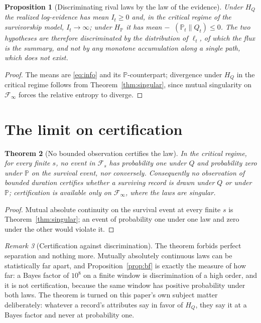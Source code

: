 \documentclass[11pt]{article}
\newcommand{\PP}{\mathbb{P}}
\newcommand{\Fc}{\mathcal{F}}
\DeclareMathOperator{\KL}{D_{\mathrm{KL}}}
\theoremstyle{plain}
\newtheorem{theorem}{Theorem}[section]
\newtheorem{proposition}[theorem]{Proposition}
\theoremstyle{definition}
\theoremstyle{remark}
\newtheorem{remark}[theorem]{Remark}
\begin{document}
\begin{proposition}[Discriminating rival laws by the law of the evidence]
\label{prop:discriminate}
Under $H_Q$ the realized log-evidence has mean $I_t\ge0$ and, in the
critical regime of the survivorship model, $I_t\to\infty$; under $H_\PP$
it has mean $-\KL(\PP_t\|Q_t)\le0$. The two hypotheses are therefore
discriminated by the distribution of $\ell_t$, of which the flux is the
summary, and not by any monotone accumulation along a single path, which
does not exist.
\end{proposition}

\begin{proof}
The means are \eqref{eq:info} and its $\PP$-counterpart; divergence under
$H_Q$ in the critical regime follows from Theorem~\ref{thm:singular},
since mutual singularity on $\Fc_\infty$ forces the relative entropy to
diverge.
\end{proof}

\section{The limit on certification}\label{sec:ceiling}

\begin{theorem}[No bounded observation certifies the law]\label{thm:ceiling}
In the critical regime, for every finite $s$, no event in $\Fc_s$ has
probability one under $Q$ and probability zero under $\PP$ on the
survival event, nor conversely. Consequently no observation of bounded
duration certifies whether a surviving record is drawn under $Q$ or under
$\PP$; certification is available only on $\Fc_\infty$, where the laws are
singular.
\end{theorem}

\begin{proof}
Mutual absolute continuity on the survival event at every finite $s$ is
Theorem~\ref{thm:singular}; an event of probability one under one law and
zero under the other would violate it.
\end{proof}

\begin{remark}[Certification against discrimination]\label{rem:certify}
The theorem forbids perfect separation and nothing more. Mutually
absolutely continuous laws can be statistically far apart, and
Proposition~\ref{prop:bf} is exactly the measure of how far: a Bayes
factor of $10^{8}$ on a finite window is discrimination of a high order,
and it is not certification, because the same window has positive
probability under both laws. The theorem is turned on this paper's own
subject matter deliberately: whatever a record's attributes say in favor
of $H_Q$, they say it at a Bayes factor and never at probability one.
\end{remark}
\end{document}

